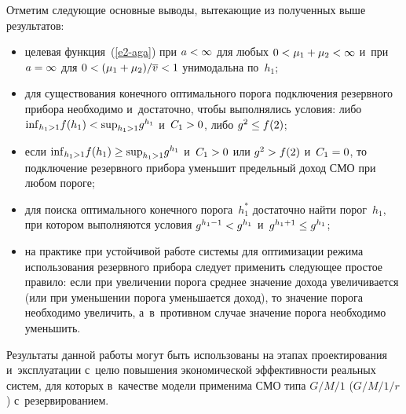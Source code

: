 \begin{multicols}{2}
  Отметим следующие основные выводы, вытекающие из полученных выше 
результатов:
  \begin{itemize}
\item целевая функция~(\ref{e2-aga}) при $a\hm<\infty$ для любых $0\hm< 
\mu_1\hm+\mu_2\hm<\infty$ и~при $a\hm=\infty$ для $0\hm< 
(\mu_1\hm+\mu_2)/\overline{v} \hm<1$ унимодальна по~$h_1$;
\item для существования конечного оптимального порога подключения 
резервного прибора необходимо и~достаточно, чтобы выполнялись условия: 
либо  $\mathrm{inf}_{h_1>1} f(h_1)\hm< \mathrm{sup}_{h_1>1} g^{h_1}$ и~$C_1\hm>0$, либо 
$g^2\hm\leq f(2)$;
\item если $\mathrm{inf}_{h_1>1} f(h_1)\hm\geq \mathrm{sup}_{h_1>1} g^{h_1}$ и~$C_1\hm>0$ 
или $g^2\hm> f(2)$ и~$C_1\hm=0$, то подключение резервного прибора 
уменьшит предельный доход СМО при любом пороге;
\item для поиска оптимального конечного порога~$h_1^*$ достаточно найти 
порог~$h_1$, при котором выполняются условия $g^{h_1-1}\hm< g^{h_1}$ 
и~$g^{h_1+1}\hm\leq g^{h_1}$;
\item на практике при устойчивой работе сис\-те\-мы для оптимизации режима 
использования резервного прибора следует применить сле\-ду\-ющее простое 
правило: если при увеличении порога среднее значение дохода 
увеличивается (или при уменьшении порога уменьшается доход), то значение 
порога необходимо увеличить, а~в~противном случае значение порога 
необходимо уменьшить. 
\end{itemize}

  Результаты данной работы могут быть использованы на этапах 
проектирования и~эксплуатации с~целю повышения экономической 
эффективности реальных сис\-тем, для которых в~качестве модели применима 
СМО типа $G/M/1$ ($G/M/1/r$) с~резервированием. 
  

\end{multicols}
